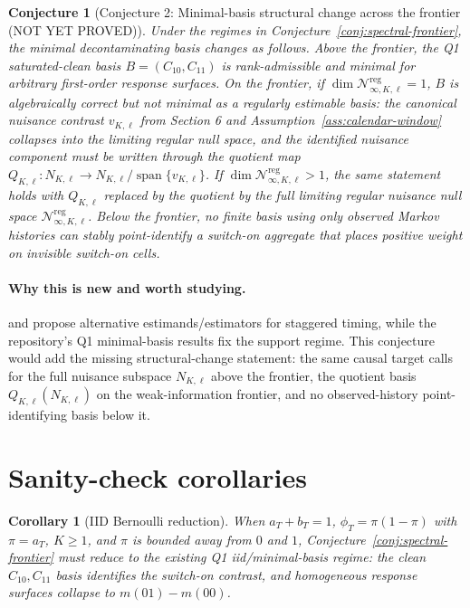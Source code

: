 \documentclass[11pt]{article}
\theoremstyle{definition}
\theoremstyle{plain}
\newtheorem{conjecture}{Conjecture}
\newtheorem{corollary}{Corollary}
\theoremstyle{remark}
\begin{document}
\begin{conjecture}[Conjecture 2: Minimal-basis structural change across the frontier (NOT YET PROVED)]\label{conj:minimal-basis-change}
Under the regimes in Conjecture~\ref{conj:spectral-frontier}, the minimal decontaminating basis changes as follows.
Above the frontier, the Q1 saturated-clean basis \(B=(C_{10},C_{11})\) is rank-admissible and minimal for arbitrary first-order response surfaces.
On the frontier, if \(\dim\mathcal N^{\mathrm{reg}}_{\infty,K,\ell}=1\), \(B\) is algebraically correct but not minimal as a regularly estimable basis: the canonical nuisance contrast \(v_{K,\ell}\) from Section 6 and Assumption~\ref{ass:calendar-window} collapses into the limiting regular null space, and the identified nuisance component must be written through the quotient map \(Q_{K,\ell}:N_{K,\ell}\to N_{K,\ell}/\operatorname{span}\{v_{K,\ell}\}\).
If \(\dim\mathcal N^{\mathrm{reg}}_{\infty,K,\ell}>1\), the same statement holds with \(Q_{K,\ell}\) replaced by the quotient by the full limiting regular nuisance null space \(\mathcal N^{\mathrm{reg}}_{\infty,K,\ell}\).
Below the frontier, no finite basis using only observed Markov histories can stably point-identify a switch-on aggregate that places positive weight on invisible switch-on cells.
\end{conjecture}
\paragraph{Why this is new and worth studying.}
\citet{sunabraham2021eventstudy} and \citet{callaway2021multiple} propose alternative estimands/estimators for staggered timing, while the repository's Q1 minimal-basis results fix the support regime.
This conjecture would add the missing structural-change statement: the same causal target calls for the full nuisance subspace \(N_{K,\ell}\) above the frontier, the quotient basis \(Q_{K,\ell}(N_{K,\ell})\) on the weak-information frontier, and no observed-history point-identifying basis below it.

\section{Sanity-check corollaries}
\begin{corollary}[IID Bernoulli reduction]\label{cor:iid}
When \(a_T+b_T=1\), \(\phi_T=\pi(1-\pi)\) with \(\pi=a_T\), \(K\ge1\), and \(\pi\) is bounded away from \(0\) and \(1\), Conjecture~\ref{conj:spectral-frontier} must reduce to the existing Q1 iid/minimal-basis regime: the clean \(C_{10},C_{11}\) basis identifies the switch-on contrast, and homogeneous response surfaces collapse to \(m(01)-m(00)\).
\end{corollary}
\end{document}
